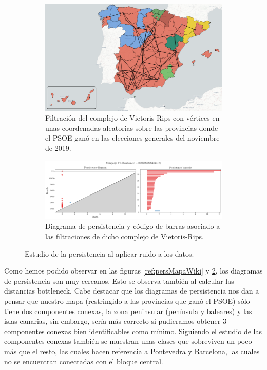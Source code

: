 \vspace*{\fill}
\newpage
\begin{figure}[!ht]
\centering
\begin{subfigure}[b]{\textwidth}
	\centering
	\includegraphics[width=\textwidth]{include/figuras/mapaRandom.png} 
	\caption{Filtración del complejo de Vietoris-Rips con vértices en unas coordenadas aleatorias sobre las provincias donde el PSOE ganó en las elecciones generales del noviembre de 2019.}
	\label{ref:mapaRandom}
\end{subfigure}
\begin{subfigure}[b]{\textwidth}
	\centering
	\includegraphics[width=\textwidth]{../code/output/ejemploMapa2.png} 
	\caption{Diagrama de persistencia y código de barras asociado a las filtraciones de dicho complejo de Vietoris-Rips.}
	\label{ref:persMapaRandom}
\end{subfigure}
\caption{Estudio de la persistencia al aplicar ruido a los datos.}
\label{ref:figMapaRandom}
\end{figure}

Como hemos podido observar en las figuras \ref{ref:persMapaWiki} y \ref{ref:persMapaRandom}, los diagramas de persistencia son muy cercanos. Esto se observa también al calcular las distancias bottleneck. Cabe destacar que los diagramas de persistencia nos dan a pensar que nuestro mapa (restringido a las provincias que ganó el PSOE) sólo tiene dos componentes conexas, la zona peninsular (península y baleares) y las islas canarias, sin embargo, sería más correcto si pudieramos obtener 3 componentes conexas  bien identificables como mínimo. Siguiendo el estudio de las componentes conexas también se muestran unas clases que sobreviven un poco más que el resto, las cuales hacen referencia a Pontevedra y Barcelona, las cuales no se encuentran conectadas con el bloque central.


